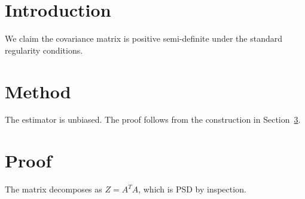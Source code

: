 \documentclass{article}
\begin{document}
\section{Introduction}

We claim the covariance matrix is positive semi-definite under the standard
regularity conditions.

\section{Method}

The estimator is unbiased. The proof follows from the construction in
Section~\ref{sec:proof}.

\section{Proof}\label{sec:proof}

The matrix decomposes as $Z = A^T A$, which is PSD by inspection.
\end{document}
